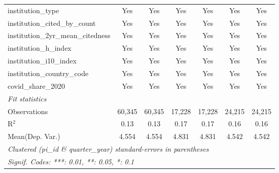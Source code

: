 \begin{tabular}{lcccccc}
   institution\_type                                           & Yes            & Yes            & Yes            & Yes            & Yes           & Yes\\  
   institution\_cited\_by\_count                               & Yes            & Yes            & Yes            & Yes            & Yes           & Yes\\  
   institution\_2yr\_mean\_citedness                           & Yes            & Yes            & Yes            & Yes            & Yes           & Yes\\  
   institution\_h\_index                                       & Yes            & Yes            & Yes            & Yes            & Yes           & Yes\\  
   institution\_i10\_index                                     & Yes            & Yes            & Yes            & Yes            & Yes           & Yes\\  
   institution\_country\_code                                  & Yes            & Yes            & Yes            & Yes            & Yes           & Yes\\  
   covid\_share\_2020                                          & Yes            & Yes            & Yes            & Yes            & Yes           & Yes\\  
   \midrule
   \emph{Fit statistics}\\
   Observations                                                & 60,345         & 60,345         & 17,228         & 17,228         & 24,215        & 24,215\\  
   R$^2$                                                       & 0.13           & 0.13           & 0.17           & 0.17           & 0.16          & 0.16\\  
Mean(Dep. Var.) & 4.554 & 4.554 & 4.831 & 4.831 & 4.542 & 4.542 \\
   \midrule \midrule
   \multicolumn{7}{l}{\emph{Clustered (pi\_id \& quarter\_year) standard-errors in parentheses}}\\
   \multicolumn{7}{l}{\emph{Signif. Codes: ***: 0.01, **: 0.05, *: 0.1}}\\
\end{tabular}
\par\endgroup
